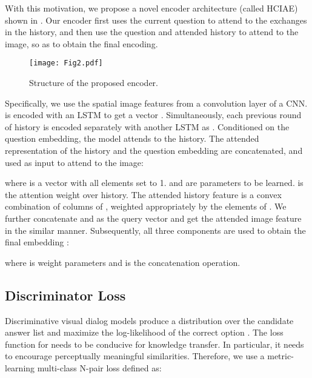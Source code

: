 \documentclass{article}
\newcommand{\ourenc}{HCIAE\xspace}
\begin{document}
With this motivation, we propose a novel encoder architecture (called \ourenc) shown in . 
Our encoder first uses the current question to attend to the exchanges in the history, 
and then use the question and attended history to attend to the image, so as to obtain the final encoding.  

\begin{wrapfigure}{r}{0.45\textwidth}
\vspace{-5mm}
  \begin{center}
    \texttt{[image: Fig2.pdf]}
  \end{center}
\caption{Structure of the proposed encoder. }\label{fig:encoder_model}  
 \vspace{-5mm}
\end{wrapfigure}


Specifically, we use the spatial image features  from a convolution layer of a CNN. 
 is encoded with an LSTM to get a vector . Simultaneously, each previous round of history  is encoded separately with another LSTM as . Conditioned on the question embedding, the model attends to the history. The attended representation of the history and the question embedding are concatenated, and used as input to attend to the image: 

where  is a vector with all elements set to 1.  and  are parameters to be
learned.  is the attention weight over history.  The attended history feature  is a convex combination of columns of , weighted appropriately by the elements of .
We further concatenate  and  as the query 
vector and get the attended image feature  in the similar manner. 
Subsequently,  all three components are used to obtain the final embedding :

where  is weight parameters and  is the concatenation operation.  
\subsection{Discriminator Loss}
\label{sec:discloss}
Discriminative visual dialog models produce a distribution over the candidate answer list 
and maximize the log-likelihood of the correct option . 
The loss function for  needs to be conducive for knowledge transfer. In particular, it needs to encourage 
perceptually meaningful similarities. Therefore, we use a metric-learning multi-class N-pair loss \cite{sohn2016improved} defined as: 

\vspace{-10pt}
\end{document}
